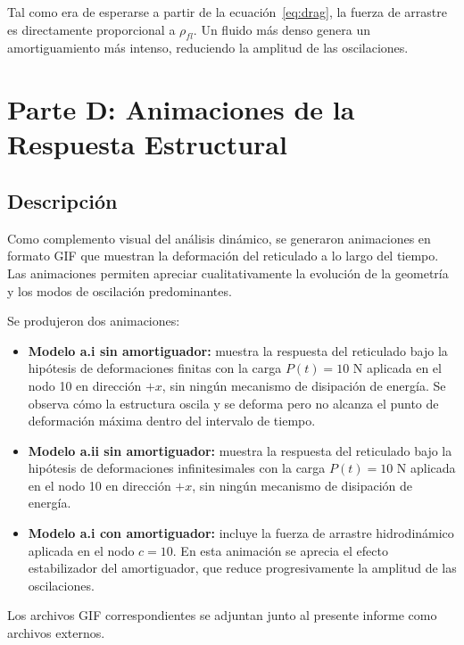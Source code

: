 \documentclass[12pt]{article}
\begin{document}
Tal como era de esperarse a partir de la ecuación~\eqref{eq:drag}, la fuerza de arrastre es directamente proporcional a $\rho_{fl}$. Un fluido más denso genera un amortiguamiento más intenso, reduciendo la amplitud de las oscilaciones.

\section{Parte D: Animaciones de la Respuesta Estructural}

\subsection{Descripción}

Como complemento visual del análisis dinámico, se generaron animaciones en formato GIF que muestran la deformación del reticulado a lo largo del tiempo. Las animaciones permiten apreciar cualitativamente la evolución de la geometría y los modos de oscilación predominantes.

Se produjeron dos animaciones:

\begin{itemize}
    \item \textbf{Modelo a.i sin amortiguador:} muestra la respuesta del reticulado bajo la hipótesis de deformaciones finitas con la carga $P(t) = 10$ N aplicada en el nodo 10 en dirección $+x$, sin ningún mecanismo de disipación de energía. Se observa cómo la estructura oscila y se deforma pero no alcanza el punto de deformación máxima dentro del intervalo de tiempo.
    
    \item \textbf{Modelo a.ii sin amortiguador:} muestra la respuesta del reticulado bajo la hipótesis de deformaciones infinitesimales con la carga $P(t) = 10$ N aplicada en el nodo 10 en dirección $+x$, sin ningún mecanismo de disipación de energía.

    \item \textbf{Modelo a.i con amortiguador:} incluye la fuerza de arrastre hidrodinámico aplicada en el nodo $c = 10$. En esta animación se aprecia el efecto estabilizador del amortiguador, que reduce progresivamente la amplitud de las oscilaciones.
\end{itemize}

Los archivos GIF correspondientes se adjuntan junto al presente informe como archivos externos.
\end{document}
